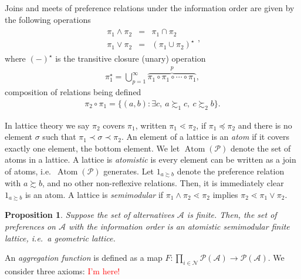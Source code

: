 \documentclass[conference]{ieeeconf}
\newcommand{\N}{\mathcal{N}}
\newcommand{\A}{\mathcal{A}}
\renewcommand{\P}{\mathcal{P}}
\newcommand{\prefers}{\succsim}
\newcommand{\join}{\vee}
\newcommand{\meet}{\wedge}
\DeclareMathOperator{\Atoms}{Atom}
\newtheorem{proposition}{Proposition}
\newtheorem{axiom}{Axiom}
\begin{document}
Joins and meets of preference relations under the information order are given by the following operations
\begin{align*}
    \begin{aligned}
        \pi_1 \meet \pi_2 &=& \pi_1 \cap \pi_2 \\
 \pi_1 \join \pi_2 &=&  (\pi_1  \cup \pi_2 )^{\star}
    \end{aligned},
\end{align*}
where $(-)^{\star}$ is the transitive closure (unary) operation
\begin{align*}
    \pi_1^{\star} = \bigcup_{p=1}^{\infty} \overbrace{\pi_1 \circ \pi_1 \circ \cdots \circ \pi_1}^{p}, 
\end{align*}
composition of relations being defined
\begin{align*}
    \pi_2 \circ \pi_1 = \{ (a,b): \exists c,~a \prefers_1 c,~c \prefers_2 b\}.
\end{align*}

In lattice theory we say $\pi_2$ covers $\pi_1$, written $\pi_1 \lessdot \pi_2$, if $\pi_1 \preceq \pi_2$ and there is no element $\sigma$ such that $\pi_1 \prec \sigma \prec \pi_2$. An element of a lattice is an \emph{atom} if it covers exactly one element, the bottom element. We let $\Atoms(\P)$ denote the set of atoms in a lattice. A lattice is \emph{atomistic} is every element can be written as a join of atoms, i.e.~$\Atoms(\P)$ generates. Let $1_{a \prefers b}$ denote the preference relation with $a \prefers b$, and no other non-reflexive relations. Then, it is immediately clear $1_{a \prefers b}$ is an atom. A lattice is \emph{semimodular} if $\pi_1 \meet \pi_2 \lessdot \pi_2$ implies $\pi_2 \lessdot \pi_1 \join \pi_2$.

\begin{proposition}
    Suppose the set of alternatives $\A$ is finite. Then, the set of preferences on $\A$ with the information order is an atomistic semimodular finite lattice, i.e.~a geometric lattice.
\end{proposition}

An \emph{aggregation function} is defined as a map $F: \prod_{i \in \N} \P(\A) \to \P(\A)$. We consider three axioms: \textcolor{red}{I'm here!}

\end{document}
